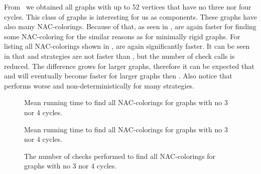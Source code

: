 From~\cite{extremal_graphs} we obtained all graphs with up to 52 vertices
that have no three nor four cycles. This class of graphs is interesting for us
as \trcon{} components. %
These graphs have also many NAC-colorings.
Because of that, as seen in ,
\NaiveCycles{} are again faster for finding some NAC-coloring
for the similar reasons as for minimally rigid graphs.
For listing all NAC-colorings shown in ,
\Subgraphs{} are again significantly faster.
It can be seen in 
that \Neighbors{} and \CyclesMatchChunks{} strategies are not faster than \None{},
but the number of \IsNACColoring{} check calls is reduced.
The difference grows for larger graphs, therefore it can be expected
that \Neighbors{} and \CyclesMatchChunks{} will eventually become faster
for larger graphs then \None{}.
Also notice that \SharedVertices{} performs worse and non-deterministically for many strategies.

\begin{figure}[p]
	\centering
	\scalebox{0.5}{}
	\caption[Mean runtime for graphs with no 3 nor 4 cycles (some).]{
		Mean running time to find all NAC-colorings for graphs with no 3 nor 4 cycles.}%
	\label{fig:graph_count_no_3_nor_4_cycles_first_runtime}
\end{figure}%
\begin{figure}[p]
	\centering
	\scalebox{0.5}{}
	\caption[Mean runtime for graphs with no 3 nor 4 cycles (all).]{
		Mean running time to find all NAC-colorings for graphs with no 3 nor 4 cycles.}%
	\label{fig:graph_count_no_3_nor_4_cycles_all_runtime}
\end{figure}%
\begin{figure}[p]
	\centering
	\scalebox{0.5}{}
	\caption[Checks performed for graphs with no 3 nor 4 cycles (all).]{
		The number of checks performed to find all NAC-colorings for graphs with no 3 nor 4 cycles.}%
	\label{fig:graph_count_no_3_nor_4_cycles_all_checks}
\end{figure}%


